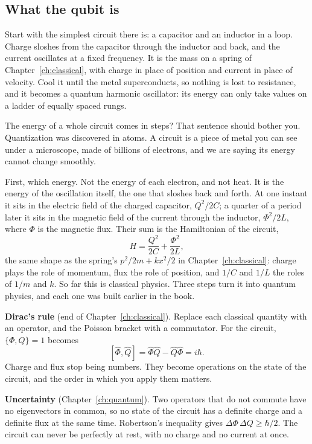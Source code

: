 \subsection{What the qubit is}

Start with the simplest circuit there is: a capacitor and an inductor in a loop. Charge
sloshes from the capacitor through the inductor and back, and the current oscillates
at a fixed frequency. It is the mass on a spring of Chapter~\ref{ch:classical}, with
charge in place of position and current in place of velocity. Cool it until the metal
superconducts, so nothing is lost to resistance, and it becomes a quantum harmonic
oscillator: its energy can only take values on a ladder of equally spaced rungs.

\begin{reflection}{The energy of a whole circuit comes in steps?}
That sentence should bother you. Quantization was discovered in atoms. A circuit is a
piece of metal you can see under a microscope, made of billions of electrons, and we
are saying its energy cannot change smoothly.

First, which energy. Not the energy of each electron, and not heat. It is the energy
of the oscillation itself, the one that sloshes back and forth. At one instant it sits
in the electric field of the charged capacitor, $Q^2/2C$; a quarter of a period later
it sits in the magnetic field of the current through the inductor, $\Phi^2/2L$, where
$\Phi$ is the magnetic flux. Their sum is the Hamiltonian of the circuit,
\[
  H = \frac{Q^2}{2C} + \frac{\Phi^2}{2L},
\]
the same shape as the spring's $p^2/2m + kx^2/2$ in Chapter~\ref{ch:classical}: charge
plays the role of momentum, flux the role of position, and $1/C$ and $1/L$ the roles of
$1/m$ and $k$. So far this is classical physics. Three steps turn it into quantum
physics, and each one was built earlier in the book.

\textbf{Dirac's rule} (end of Chapter~\ref{ch:classical}). Replace each classical
quantity with an operator, and the Poisson bracket with a commutator. For the circuit,
$\{\Phi, Q\} = 1$ becomes
\[
  [\hat\Phi, \hat Q] = \hat\Phi\hat Q - \hat Q\hat\Phi = i\hbar .
\]
Charge and flux stop being numbers. They become operations on the state of the
circuit, and the order in which you apply them matters.

\textbf{Uncertainty} (Chapter~\ref{ch:quantum}). Two operators that do not commute
have no eigenvectors in common, so no state of the circuit has a definite charge and a
definite flux at the same time. Robertson's inequality gives
$\Delta\Phi\,\Delta Q \geq \hbar/2$. The circuit can never be perfectly at rest, with
no charge and no current at once.


\end{reflection}
